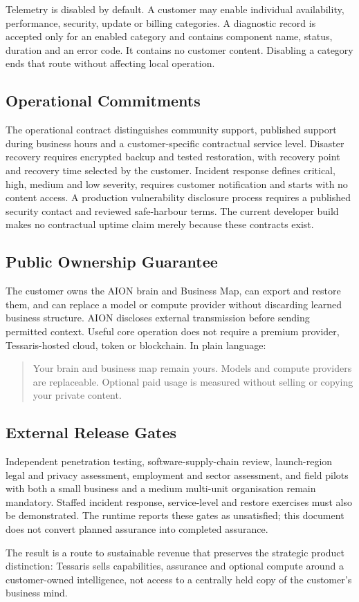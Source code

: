 Telemetry is disabled by default.  A customer may enable individual availability, performance,
security, update or billing categories.  A diagnostic record is accepted only for an enabled
category and contains component name, status, duration and an error code.  It contains no customer
content.  Disabling a category ends that route without affecting local operation.

\subsection{Operational Commitments}

The operational contract distinguishes community support, published support during business hours and a
customer-specific contractual service level.  Disaster recovery requires encrypted backup and
tested restoration, with recovery point and recovery time selected by the customer.  Incident
response defines critical, high, medium and low severity, requires customer notification and starts
with no content access.  A production vulnerability disclosure process requires a published security
contact and reviewed safe-harbour terms.  The current developer build makes no contractual uptime
claim merely because these contracts exist.

\subsection{Public Ownership Guarantee}

The customer owns the AION brain and Business Map, can export and restore them, and can replace a
model or compute provider without discarding learned business structure.  AION discloses external
transmission before sending permitted context.  Useful core operation does not require a premium
provider, Tessaris-hosted cloud, token or blockchain.  In plain language:

\begin{quote}
Your brain and business map remain yours. Models and compute providers are replaceable. Optional
paid usage is measured without selling or copying your private content.
\end{quote}

\subsection{External Release Gates}

Independent penetration testing, software-supply-chain review, launch-region legal and privacy
assessment, employment and sector assessment, and field pilots with both a small business and a
medium multi-unit organisation remain mandatory.  Staffed incident response, service-level and
restore exercises must also be demonstrated.  The runtime reports these gates as unsatisfied; this
document does not convert planned assurance into completed assurance.

The result is a route to sustainable revenue that preserves the strategic product distinction:
Tessaris sells capabilities, assurance and optional compute around a customer-owned intelligence,
not access to a centrally held copy of the customer's business mind.
